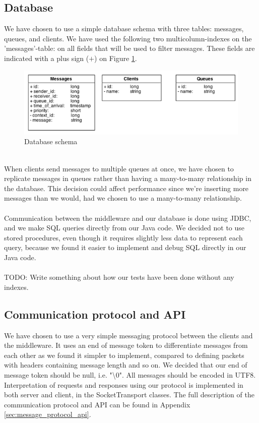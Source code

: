 \documentclass{article}
\begin{document}
        \subsection{Database}
            We have chosen to use a simple database schema with three tables: messages, queues, and clients. We have used the following two multicolumn-indexes on the 'messages'-table:  on all fields that will be used to filter messages. These fields are indicated with a plus sign ($+$) on Figure \ref{fig:database_schema}. 
            \begin{figure}[H]
                \centering
                \includegraphics[scale=0.50]{database_schema}
                \caption{Database schema}
                \label{fig:database_schema}
            \end{figure}
            ~\\
            When clients send messages to multiple queues at once, we have chosen to replicate messages in queues rather than having a many-to-many relationship in the database. This decision could affect performance since we're inserting more messages than we would, had we chosen to use a many-to-many relationship.\\
            \\
            Communication between the middleware and our database is done using JDBC, and we make SQL queries directly from our Java code. We decided not to use stored procedures, even though it requires slightly less data to represent each query, because we found it easier to implement and debug SQL directly in our Java code.\\
            \\
            TODO: Write something about how our tests have been done without any indexes.

        \subsection{Communication protocol and API}
            We have chosen to use a very simple messaging protocol between the clients and the middleware. It uses an end of message token to differentiate messages from each other as we found it simpler to implement, compared to defining packets with headers containing message length and so on. We decided that our end of message token should be null, i.e. "\textbackslash0". All messages should be encoded in UTF8.\\
            Interpretation of requests and responses using our protocol is implemented in both server and client, in the SocketTransport classes. The full description of the communication protocol and API can be found in Appendix \ref{sec:message_protocol_api}.
\end{document}
